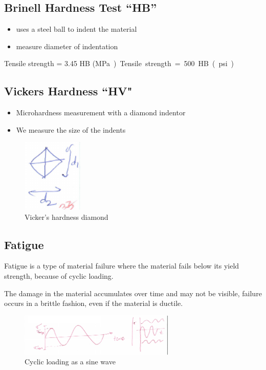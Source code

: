 \documentclass{article}
\begin{document}
\subsection{Brinell Hardness Test ``HB''}

\begin{itemize}
    \item uses a steel ball to indent the material
    \item measure diameter of indentation
\end{itemize}

Tensile strength = 3.45 HB (\si\MPa)

Tensile strength = 500 HB (psi)

\subsection{Vickers Hardness ``HV"}

\begin{itemize}
    \item Microhardness measurement with a diamond indentor
    \item We measure the size of the indents
\end{itemize}

\begin{figure}[h!]
	\centering
	\includegraphics[width=0.26\textwidth]{assets/e44ed62b.png}
	\caption{Vicker's hardness diamond}
\end{figure}

\subsection{Fatigue}

Fatigue is a type of material failure where the material fails below its yield strength, because of cyclic loading.

The damage in the material accumulates over time and may not be visible, failure occurs in a brittle fashion, even if the material is ductile.

\begin{figure}[h!]
	\centering
	\includegraphics[width=0.66\textwidth]{assets/76631775.png}
	\caption{Cyclic loading as a sine wave}
\end{figure}
\end{document}
